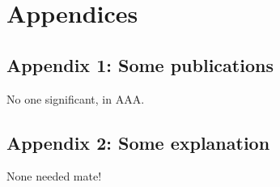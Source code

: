 \chapter*{Appendices}

\section*{Appendix 1: Some publications}

No one significant, in AAA.

\section*{Appendix 2: Some explanation}

None needed mate!